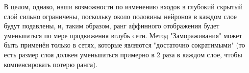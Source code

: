 В целом, однако, наши возможности по изменению входов в глубокий скрытый слой сильно ограничены, поскольку около половины нейронов в каждом слое будут подавлены, и, таким образом, ранг аффинного отображения будет уменьшаться по мере продвижения вглубь сети. Метод "Замораживания" может быть применён только в сетях, которые являются "достаточно сократимыми" (то есть размер слоя должен уменьшаться примерно в 2 раза в каждом слое, чтобы компенсировать потерю ранга).